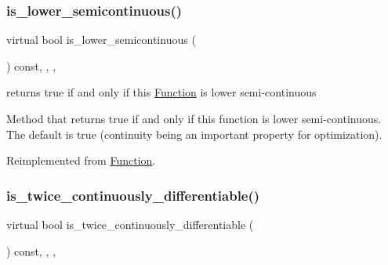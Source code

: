 \subsubsection{\texorpdfstring{is\+\_\+lower\+\_\+semicontinuous()}{is\_lower\_semicontinuous()}}
{\footnotesize\ttfamily virtual bool is\+\_\+lower\+\_\+semicontinuous (\begin{DoxyParamCaption}\item[{void}]{ }\end{DoxyParamCaption}) const\hspace{0.3cm}{\ttfamily [inline]}, {\ttfamily [final]}, {\ttfamily [override]}, {\ttfamily [virtual]}}



returns true if and only if this \mbox{\hyperlink{class_s_m_spp__di__unipi__it_1_1_function}{Function}} is lower semi-\/continuous 

Method that returns true if and only if this function is lower semi-\/continuous. The default is true (continuity being an important property for optimization). 

Reimplemented from \mbox{\hyperlink{class_s_m_spp__di__unipi__it_1_1_function_a72b5052e29d7f37c9798d9d6d33bd405}{Function}}.

\mbox{\label{class_s_m_spp__di__unipi__it_1_1_d_quad_function_a272aecba91401ca432dfa79ad6091c3e}} 
\subsubsection{\texorpdfstring{is\+\_\+twice\+\_\+continuously\+\_\+differentiable()}{is\_twice\_continuously\_differentiable()}}
{\footnotesize\ttfamily virtual bool is\+\_\+twice\+\_\+continuously\+\_\+differentiable (\begin{DoxyParamCaption}\item[{void}]{ }\end{DoxyParamCaption}) const\hspace{0.3cm}{\ttfamily [inline]}, {\ttfamily [final]}, {\ttfamily [override]}, {\ttfamily [virtual]}}



